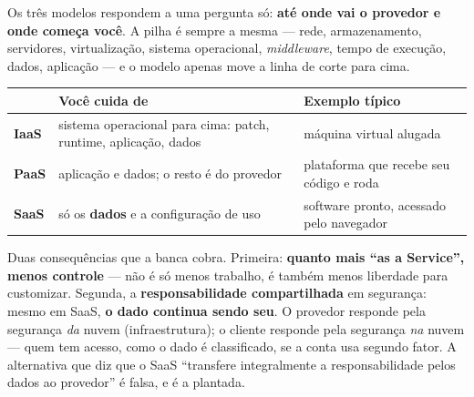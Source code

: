 \begin{conceito}
Os três modelos respondem a uma pergunta só: \textbf{até onde vai o provedor e
onde começa você}. A pilha é sempre a mesma --- rede, armazenamento,
servidores, virtualização, sistema operacional, \emph{middleware}, tempo de
execução, dados, aplicação --- e o modelo apenas move a linha de corte para
cima.

\begin{center}
\begin{tabular}{@{}p{2cm}p{4.6cm}p{5.4cm}@{}}
\toprule
& \textbf{Você cuida de} & \textbf{Exemplo típico} \\
\midrule
\textbf{IaaS} & sistema operacional para cima: patch, runtime, aplicação, dados & máquina virtual alugada \\
\textbf{PaaS} & aplicação e dados; o resto é do provedor & plataforma que recebe seu código e roda \\
\textbf{SaaS} & só os \textbf{dados} e a configuração de uso & software pronto, acessado pelo navegador \\
\bottomrule
\end{tabular}
\end{center}

Duas consequências que a banca cobra. Primeira: \textbf{quanto mais ``as a
Service'', menos controle} --- não é só menos trabalho, é também menos
liberdade para customizar. Segunda, a \textbf{responsabilidade compartilhada}
em segurança: mesmo em SaaS, \textbf{o dado continua sendo seu}. O provedor
responde pela segurança \emph{da} nuvem (infraestrutura); o cliente responde
pela segurança \emph{na} nuvem --- quem tem acesso, como o dado é
classificado, se a conta usa segundo fator. A alternativa que diz que o SaaS
``transfere integralmente a responsabilidade pelos dados ao provedor'' é
falsa, e é a plantada.
\end{conceito}

